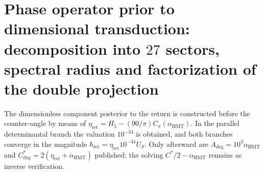 

\HMTFlushCurrentChapter
\chapter{Phase operator prior to dimensional transduction: decomposition into \(27\) sectors, spectral radius and factorization of the double projection}%
\begingroup
\renewcommand{\chapter}[2][]{}%
%
\endgroup

\HMTFlushCurrentChapter
\chapter{Exact equivalence of the global and analytic charts of the angular pair: degrees, radians, phases \texorpdfstring{\(q_{\pm}\)}{q+/-}, and complementary orientation}
\label{chap:p3-final:38:angulo_contraangulo}
The dimensionless component posterior to the return is constructed before the
counter-angle by means of
\(\eta_{\mathrm{ret}}=H_5-(90/\pi)C_\pi(\alpha_{\mathrm{HMT}})\).
In the parallel determinantal branch the valuation \(10^{-34}\) is obtained, and
both branches converge in the magnitude
\(\hbar_{\mathrm{ret}}=\eta_{\mathrm{ret}}10^{-34}U_S\).
Only afterward are
\(A_{\mathrm{deg}}=10^3\alpha_{\mathrm{HMT}}\) and
\(C^*_{\mathrm{deg}}=2(\eta_{\mathrm{ret}}+\alpha_{\mathrm{HMT}})\)
published;
the solving \(C^*/2-\alpha_{\mathrm{HMT}}\) remains as inverse verification.


\HMTFlushCurrentChapter
\chapter{Positive constitutive operator of the vacuum: \(3\to4\) completion, spectral reconstruction and joint derivation of \texorpdfstring{\(\varepsilon,\mu,Z\)}{epsilon, mu, and Z} and \(c\)}%
\begingroup
\renewcommand{\chapter}[2][]{}%
%
\endgroup

